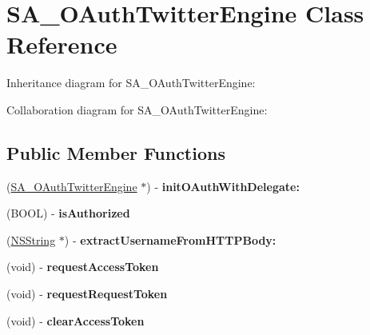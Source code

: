 \hypertarget{interface_s_a___o_auth_twitter_engine}{
\section{\-S\-A\-\_\-\-O\-Auth\-Twitter\-Engine \-Class \-Reference}
\label{interface_s_a___o_auth_twitter_engine}
}


\-Inheritance diagram for \-S\-A\-\_\-\-O\-Auth\-Twitter\-Engine\-:


\-Collaboration diagram for \-S\-A\-\_\-\-O\-Auth\-Twitter\-Engine\-:
\subsection*{\-Public \-Member \-Functions}
\begin{DoxyCompactItemize}
\item 
\hypertarget{interface_s_a___o_auth_twitter_engine_a094f94ffe5dbcce632e6ddccd8fc7941}{
(\hyperlink{interface_s_a___o_auth_twitter_engine}{\-S\-A\-\_\-\-O\-Auth\-Twitter\-Engine} $\ast$) -\/ {\bfseries init\-O\-Auth\-With\-Delegate\-:}}
\label{interface_s_a___o_auth_twitter_engine_a094f94ffe5dbcce632e6ddccd8fc7941}

\item 
\hypertarget{interface_s_a___o_auth_twitter_engine_ad4c89811d013e4abf19b804a9cc3d0d8}{
(\-B\-O\-O\-L) -\/ {\bfseries is\-Authorized}}
\label{interface_s_a___o_auth_twitter_engine_ad4c89811d013e4abf19b804a9cc3d0d8}

\item 
\hypertarget{interface_s_a___o_auth_twitter_engine_a1625ebf2fc59d24a7883f5a93d87e8eb}{
(\hyperlink{class_n_s_string}{\-N\-S\-String} $\ast$) -\/ {\bfseries extract\-Username\-From\-H\-T\-T\-P\-Body\-:}}
\label{interface_s_a___o_auth_twitter_engine_a1625ebf2fc59d24a7883f5a93d87e8eb}

\item 
\hypertarget{interface_s_a___o_auth_twitter_engine_add65ab8b2cf11bd219d238f6c9c177a6}{
(void) -\/ {\bfseries request\-Access\-Token}}
\label{interface_s_a___o_auth_twitter_engine_add65ab8b2cf11bd219d238f6c9c177a6}

\item 
\hypertarget{interface_s_a___o_auth_twitter_engine_a999967b00a618a9bd7109d6c744bfdb4}{
(void) -\/ {\bfseries request\-Request\-Token}}
\label{interface_s_a___o_auth_twitter_engine_a999967b00a618a9bd7109d6c744bfdb4}

\item 
\hypertarget{interface_s_a___o_auth_twitter_engine_a47648a4a45813f612b14a9d01ebd406d}{
(void) -\/ {\bfseries clear\-Access\-Token}}
\label{interface_s_a___o_auth_twitter_engine_a47648a4a45813f612b14a9d01ebd406d}


\end{DoxyCompactItemize}
